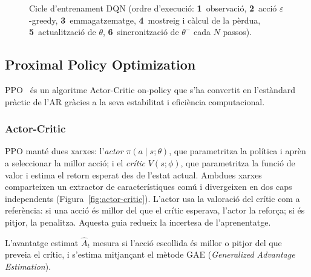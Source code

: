 \begin{figure}[H]
  \caption{Cicle d'entrenament \acs{DQN} (ordre d'execució: \textbf{1}~observació, \textbf{2}~acció $\varepsilon$-greedy, \textbf{3}~emmagatzematge, \textbf{4}~mostreig i càlcul de la pèrdua, \textbf{5}~actualització de $\theta$, \textbf{6}~sincronització de $\theta^-$ cada $N$ passos).}
  \label{fig:dqn}
\end{figure}

\subsection{Proximal Policy Optimization}
\label{sec:ppo}

\ac{PPO}~\cite{schulman2017ppo} és un algoritme Actor-Critic on-policy que
s'ha convertit en l'estàndard pràctic de l'\ac{AR} gràcies a la seva
estabilitat i eficiència computacional.

\subsubsection*{Actor-Critic}

PPO manté dues xarxes: l'\emph{actor} $\pi(a \mid s; \theta)$, que parametritza
la política i aprèn a seleccionar la millor acció; i el \emph{crític}
$V(s; \phi)$, que parametritza la funció de valor i estima el retorn esperat des
de l'estat actual. Ambdues xarxes comparteixen un extractor de característiques
comú i divergeixen en dos caps independents (Figura~\ref{fig:actor-critic}).
L'actor usa la valoració del crític com a referència: si una acció és millor
del que el crític esperava, l'actor la reforça; si és pitjor, la penalitza.
Aquesta guia redueix la incertesa de l'aprenentatge.

L'avantatge estimat $\hat{A}_t$ mesura si l'acció escollida és millor o pitjor
del que preveia el crític, i s'estima mitjançant el mètode GAE
(\emph{Generalized Advantage Estimation}).

